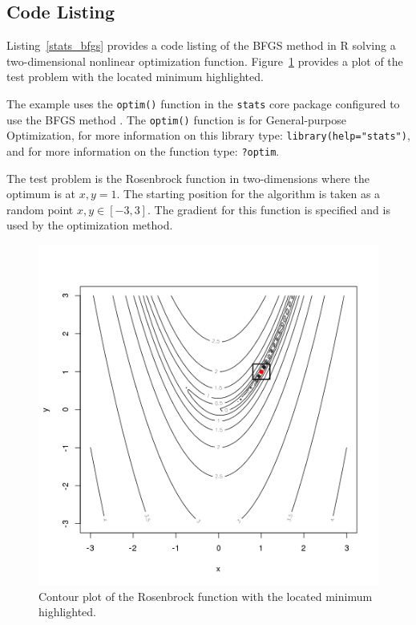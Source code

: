 \subsection{Code Listing}
Listing~\ref{stats_bfgs} provides a code listing of the BFGS method in R solving a two-dimensional nonlinear optimization function. Figure~\ref{plot:bfgs_result} provides a plot of the test problem with the located minimum highlighted.

The example uses the \texttt{optim()} function in the \texttt{stats} core package configured to use the BFGS method \cite{RDCT2011a}. The \texttt{optim()} function is for General-purpose Optimization, for more information on this library type: \texttt{library(help="stats")}, and for more information on the function type: \texttt{?optim}.

The test problem is the Rosenbrock function in two-dimensions where the optimum is at $x,y=1$. The starting position for the algorithm is taken as a random point $x,y \in [-3,3]$. The gradient for this function is specified and is used by the optimization method.




\begin{figure}[htp]
\centering
\includegraphics[scale=0.45]{a_optimization/bfgs_result.png}
\caption{Contour plot of the Rosenbrock function with the located minimum highlighted.}
\label{plot:bfgs_result}
\end{figure}

